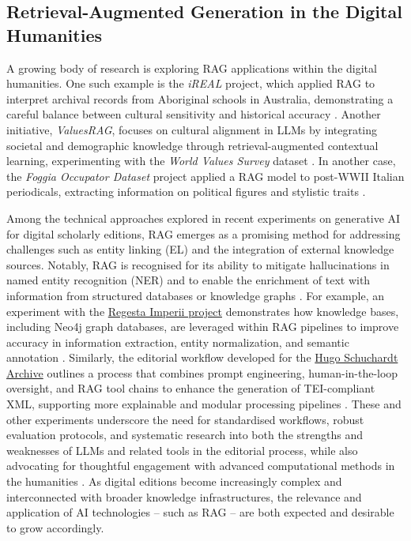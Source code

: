 \begin{spacing}{1.5}
\section{Retrieval-Augmented Generation in the Digital Humanities}\label{sec:rag_dh}
A growing body of research is exploring RAG applications within the digital humanities. One such example is the \textit{iREAL} project, which applied RAG to interpret archival records from Aboriginal schools in Australia, demonstrating a careful balance between cultural sensitivity and historical accuracy \citep{callaghan_prototyping_2025}. Another initiative, \textit{ValuesRAG}, focuses on cultural alignment in LLMs by integrating societal and demographic knowledge through retrieval-augmented contextual learning, experimenting with the \textit{World Values Survey} dataset \citep{seo_valuesrag_2025}. In another case, the \textit{Foggia Occupator Dataset} project applied a RAG model to post-WWII Italian periodicals, extracting information on political figures and stylistic traits \citep{ciletti_retrieval-augmented_2025}.

Among the technical approaches explored in recent experiments on generative AI for digital scholarly editions, RAG emerges as a promising method for addressing challenges such as entity linking (EL) and the integration of external knowledge sources. Notably, RAG is recognised for its ability to mitigate hallucinations in named entity recognition (NER) and to enable the enrichment of text with information from structured databases or knowledge graphs \citep{pollin_when_2025}. For example, an experiment with the \href{https://www.regesta-imperii.de/en/home.html}{Regesta Imperii project}\nocite{noauthor_home_nodate} demonstrates how knowledge bases, including Neo4j graph databases, are leveraged within RAG pipelines to improve accuracy in information extraction, entity normalization, and semantic annotation \citep{kuczera_chatgpt_2024}. Similarly, the editorial workflow developed for the \href{https://web.archive.org/web/20241120122545/https://gams.uni-graz.at/context:hsa}{Hugo Schuchardt Archive} outlines a process that combines prompt engineering, human-in-the-loop oversight, and RAG tool chains to enhance the generation of TEI-compliant XML, supporting more explainable and modular processing pipelines \citep{pollin_new_2023}. These and other experiments underscore the need for standardised workflows, robust evaluation protocols, and systematic research into both the strengths and weaknesses of LLMs and related tools in the editorial process, while also advocating for thoughtful engagement with advanced computational methods in the humanities \citep{pollin_workshop_2024}. As digital editions become increasingly complex and interconnected with broader knowledge infrastructures, the relevance and application of AI technologies -- such as RAG -- are both expected and desirable to grow accordingly.


\end{spacing}
